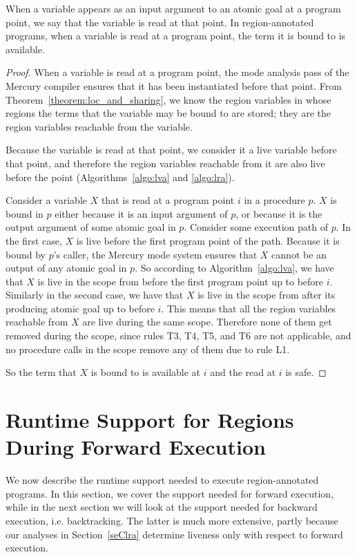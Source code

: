 \documentclass{tlp}
\begin{document}
\begin{theorem}
When a variable appears as an input argument
to an atomic goal at a program point,
we say that the variable is read at that point.
In region-annotated programs,
when a variable is read at a program point,
the term it is bound to is available.
\end{theorem}

\begin{proof}
When a variable is read at a program point,
the mode analysis pass of the Mercury compiler ensures
that it has been instantiated before that point.
From Theorem~\ref{theorem:loc_and_sharing},
we know the region variables in whose regions
the terms that the variable may be bound to are stored;
they are the region variables reachable from the variable.

Because the variable is read at that point,
we consider it a live variable before that point,
and therefore the region variables reachable from it
are also live before the point
(Algorithms~\ref{algo:lva} and \ref{algo:lra}).

Consider a variable $X$ that is read at a program point $i$ in a procedure $p$.
$X$ is bound in $p$
either because it is an input argument of $p$,
or because it is the output argument of some atomic goal in $p$.
Consider some execution path of $p$.
In the first case, $X$ is live before the first program point of the path.
Because it is bound by $p$'s caller, the Mercury mode system ensures that
$X$ cannot be an output of any atomic goal in $p$.
So according to Algorithm~\ref{algo:lva}, we have that
$X$ is live in the scope from before the first program point up to before $i$.
Similarly in the second case, we have that
$X$ is live in the scope from after its producing atomic goal up to before $i$.
This means that all the region variables reachable from $X$
are live during the same scope.
Therefore none of them get removed during the scope,
since rules T3, T4, T5, and T6 are not applicable,
and no procedure calls in the scope remove any of them due to rule L1.

So the term that $X$ is bound to is available at $i$
and the read at $i$ is safe.
\end{proof}

\section{Runtime Support for Regions During Forward Execution}
\label{seCsupportdet}

We now describe the runtime support needed
to execute region-annotated programs.
In this section,
we cover the support needed for forward execution,
while in the next section we will look at
the support needed for backward execution, i.e. backtracking.
The latter is much more extensive,
partly because our analyses in Section~\ref{seClra}
determine liveness only with respect to forward execution.
\end{document}
